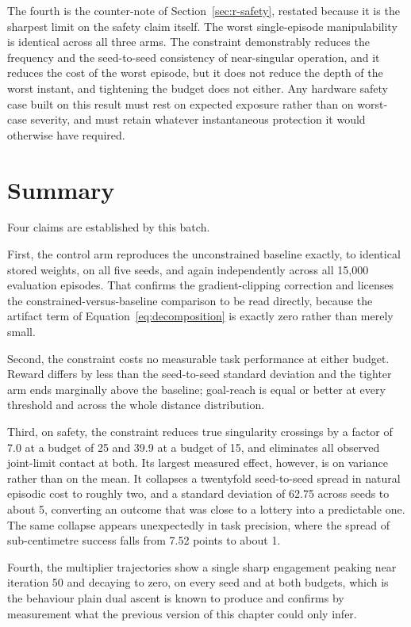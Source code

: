 The fourth is the counter-note of Section~\ref{sec:r-safety}, restated because it is the sharpest
limit on the safety claim itself. The worst single-episode manipulability is identical across all
three arms. The constraint demonstrably reduces the frequency and the seed-to-seed consistency of
near-singular operation, and it reduces the cost of the worst episode, but it does not reduce the
depth of the worst instant, and tightening the budget does not either. Any hardware safety case
built on this result must rest on expected exposure rather than on worst-case severity, and must
retain whatever instantaneous protection it would otherwise have required.

\section{Summary}\label{sec:r-summary}

Four claims are established by this batch.

First, the control arm reproduces the unconstrained baseline exactly, to identical stored
weights, on all five seeds, and again independently across all 15{,}000 evaluation episodes. That
confirms the gradient-clipping correction and licenses the constrained-versus-baseline comparison
to be read directly, because the artifact term of Equation~\eqref{eq:decomposition} is exactly
zero rather than merely small.

Second, the constraint costs no measurable task performance at either budget. Reward differs by
less than the seed-to-seed standard deviation and the tighter arm ends marginally above the
baseline; goal-reach is equal or better at every threshold and across the whole distance
distribution.

Third, on safety, the constraint reduces true singularity crossings by a factor of 7.0 at a
budget of 25 and 39.9 at a budget of 15, and eliminates all observed joint-limit contact at both.
Its largest measured effect, however, is on variance rather than on the mean. It collapses a
twentyfold seed-to-seed spread in natural episodic cost to roughly two, and a standard deviation
of 62.75 across seeds to about 5, converting an outcome that was close to a lottery into a
predictable one. The same collapse appears unexpectedly in task precision, where the spread of
sub-centimetre success falls from 7.52 points to about 1.

Fourth, the multiplier trajectories show a single sharp engagement peaking near iteration 50 and
decaying to zero, on every seed and at both budgets, which is the behaviour plain dual ascent is
known to produce and confirms by measurement what the previous version of this chapter could only
infer.

